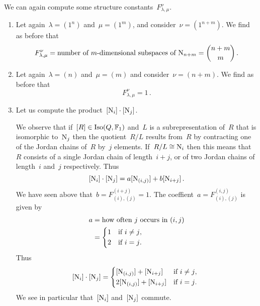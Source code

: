 \documentclass[a4paper,11pt]{scrartcl}
\begin{document}
\begin{example}
  \label{computing multiplication over F1}
  We can again compute some structure constants~$F^\nu_{\lambda, \mu}$.
  \begin{enumerate}
    \item
      Let again~$\lambda = (1^n)$ and~$\mu = (1^m)$, and consider~$\nu = (1^{n+m})$.
      We find as before that
      \[
        F^{\nu}_{\lambda, \mu}
        =
        \text{number of~\dimensional{$m$} subspaces of~$\Nil_{n+m}$}
        =
        \binom{n+m}{m} \,.
      \]
    \item
      Let again~$\lambda = (n)$ and~$\mu = (m)$ and consider~$\nu = (n+m)$.
      We find as before that
      \[
        F^{\nu}_{\lambda, \mu} = 1 \,.
      \]
    \item
      Let us compute the product~$[\mathrm{N}_i] \cdot [\mathrm{N}_j]$.

      We observe that if~$[R] \in \operatorname{Iso}(Q, \mathbb{F}_1)$ and~$L$ is a subrepresentation of~$R$ that is isomorphic to~$\mathrm{N}_j$ then the quotient~$R/L$ results from~$R$ by contracting one of the Jordan chains of~$R$ by~$j$ elements.
      If~$R/L \cong \mathrm{N}_i$ then this means that~$R$ consists of a single Jordan chain of length~$i+j$, or of two Jordan chains of length~$i$ and~$j$ respectively.
      Thus
      \[
        [\mathrm{N}_i] \cdot [\mathrm{N}_j]
        =
        a [ \mathrm{N}_{(i,j)} ]
        +
        b [ \mathrm{N}_{i+j} ] \,.
      \]
      We have seen above that~$b = F^{(i+j)}_{(i),(j)} = 1$.
      The coeffient~$a = F^{(i,j)}_{(i),(j)}$ is given by
      \begin{align*}
        a
        &=
        \text{how often~$j$ occurs in~$(i,j)$}
        \\
        &=
        \begin{cases*}
          1
          &
          if~$i \neq j$,
          \\
          2
          &
          if~$i = j$.
        \end{cases*}
      \end{align*}
      Thus
      \begin{equation}
        \label{computing product of two generators for representations}
        \class{\Nil_i} \cdot \class{\Nil_j}
        =
        \begin{cases*}
          \class{\Nil_{(i,j)}} + \class{\Nil_{i+j}}
          &
          if~$i \neq j$,
          \\
          2 \class{\Nil_{(i,j)}} + \class{\Nil_{i+j}}
          &
          if~$i = j$.
        \end{cases*}
      \end{equation}
      We see in particular that~$[\mathrm{N}_i]$ and~$[\mathrm{N}_j]$ commute.
  \end{enumerate}
\end{example}
\end{document}
